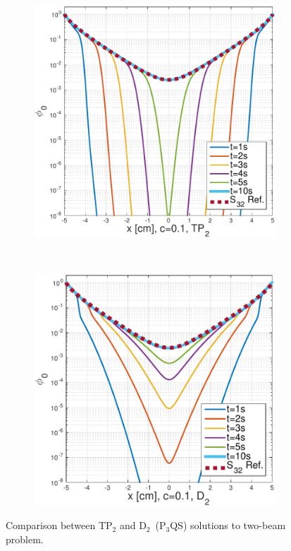 \documentclass[review]{elsarticle}
\begin{document}
\begin{figure}[ht!]
	\begin{subfigure}{.5\textwidth}
		\centering
		\hspace*{-1cm}\includegraphics[width=1.\linewidth]{tp2_bru.pdf}
	\end{subfigure}
	~
	\begin{subfigure}{.5\textwidth}
		\centering
		\includegraphics[width=1.\linewidth]{d2_bru.pdf}
	\end{subfigure}
	\caption{Comparison between TP$_2$ and D$_2$\ (P$_3$QS) solutions to two-beam problem.}
	\label{exp}
\end{figure}
\end{document}
